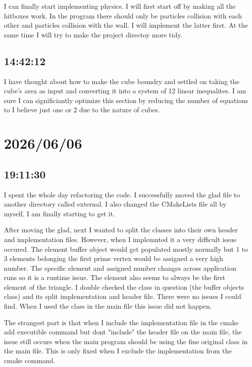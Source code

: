 \documentclass{article}
\begin{document}
I can finally start implementing physics. I will first start off by making all the hitboxes work.
In the program there should only be particles collision with each other and particles collision with
the wall. I will implement the latter first. At the same time I will try to make the project directoy 
more tidy.

\subsection*{14:42:12}
I have thought about how to make the cube boundry and settled on taking the cube's area as input
and converting it into a system of 12 linear inequalites. I am sure I can significiantly optimize
this section by reducing the number of equations to I believe just one or 2 due to the nature of
cubes.

\section*{2026/06/06}
\subsection*{19:11:30}
I spent the whole day refactoring the code. I successfully moved the glad file to another directory
called external. I also changed the CMakeLists file all by myself, I am finally starting to get it.

After moving the glad, next I wanted to split the classes into their own header and implementation
files. However, when I implemnted it a very difficult issue occured. The element buffer object would
get populated mostly normally but 1 to 3 elements belonging the first prime vertex would be assigned 
a very high number. The specific element and assigned number changes across application runs so it is
a runtime issue. The element also seems to always be the first element of the triangle. I double
checked the class in question (the buffer objects class) and its split implementation and header file.
There were no issues I could find. When I used the class in the main file this issue did not happen.

The strangest part is that when I include the implementation file in the cmake add executible command
but dont "include" the header file on the main file, the issue still occurs when the main program
should be using the fine original class in the main file. This is only fixed when I exclude the implementation
from the cmake command. 
\end{document}
